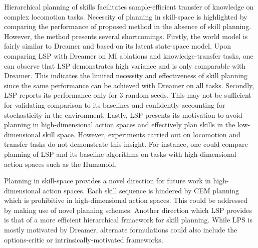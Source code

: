 \documentclass[11pt,letterpaper]{article}
\begin{document}
Hierarchical planning of skills facilitates sample-efficient transfer of knowledge on complex locomotion tasks. Necessity of planning in skill-space is highlighted by comparing the performance of proposed method in the absence of skill planning. However, the method presents several shortcomings. Firstly, the world model is fairly similar to Dreamer and based on its latent state-space model. Upon comparing LSP with Dreamer on MI ablations and knowledge-transfer tasks, one can observe that LSP demonstrates high variance and is only comparable with Dreamer. This indicates the limited necessity and effectiveness of skill planning since the same performance can be achieved with Dreamer on all tasks. Secondly, LSP reports its performance only for 3 random seeds. This may not be sufficient for validating comparison to its baselines and confidently accounting for stochasticity in the environment. Lastly, LSP presents its motivation to avoid planning in high-dimensional action spaces and effectively plan skills in the low-dimensional skill space. However, experiments carried out on locomotion and transfer tasks do not demonstrate this insight. For instance, one could compare planning of LSP and its baseline algorithms on tasks with high-dimensional action spaces such as the Humanoid. 

Planning in skill-space provides a novel direction for future work in high-dimensional action spaces. Each skill sequence is hindered by CEM planning which is prohibitive in high-dimensional action spaces. This could be addressed by making use of novel planning schemes. Another direction which LSP provides is that of a more efficient hierarchical frmaework for skill planning. While LPS is mostly motivated by Dreamer, alternate formulations could also include the options-critic or intrinsically-motivated frameworks. 
\end{document}

